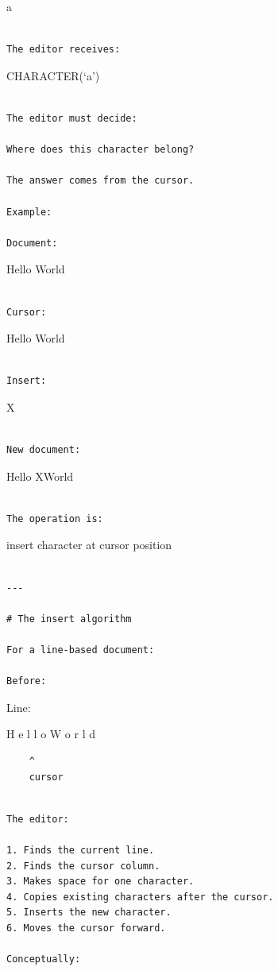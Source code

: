 \documentclass[
  oneside,
  openany]{book}
\begin{document}
a

\begin{verbatim}

The editor receives:
\end{verbatim}

CHARACTER(`a')

\begin{verbatim}

The editor must decide:

Where does this character belong?

The answer comes from the cursor.

Example:

Document:
\end{verbatim}

Hello World

\begin{verbatim}

Cursor:
\end{verbatim}

Hello \textbar World

\begin{verbatim}

Insert:
\end{verbatim}

X

\begin{verbatim}

New document:
\end{verbatim}

Hello XWorld

\begin{verbatim}

The operation is:
\end{verbatim}

insert character at cursor position

\begin{verbatim}

---

# The insert algorithm

For a line-based document:

Before:
\end{verbatim}

Line:

H e l l o W o r l d

\begin{verbatim}
    ^
    cursor
\end{verbatim}

\begin{verbatim}

The editor:

1. Finds the current line.
2. Finds the cursor column.
3. Makes space for one character.
4. Copies existing characters after the cursor.
5. Inserts the new character.
6. Moves the cursor forward.

Conceptually:
\end{verbatim}
\end{document}
